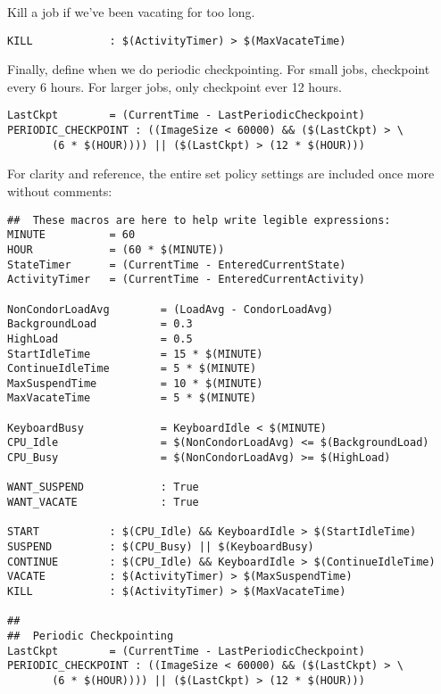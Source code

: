 Kill a job if we've been vacating for too long.

\begin{verbatim}
KILL            : $(ActivityTimer) > $(MaxVacateTime)
\end{verbatim}

Finally, define when we do periodic checkpointing.  For small jobs,
checkpoint every 6 hours.  For larger jobs, only checkpoint ever 12
hours.  

\begin{verbatim}
LastCkpt        = (CurrentTime - LastPeriodicCheckpoint)
PERIODIC_CHECKPOINT : ((ImageSize < 60000) && ($(LastCkpt) > \
       (6 * $(HOUR)))) || ($(LastCkpt) > (12 * $(HOUR))) 
\end{verbatim}

For clarity and reference, the entire set policy settings are included
once more without comments:

\begin{verbatim}
##  These macros are here to help write legible expressions:
MINUTE          = 60
HOUR            = (60 * $(MINUTE))
StateTimer      = (CurrentTime - EnteredCurrentState)
ActivityTimer   = (CurrentTime - EnteredCurrentActivity)

NonCondorLoadAvg        = (LoadAvg - CondorLoadAvg)
BackgroundLoad          = 0.3
HighLoad                = 0.5
StartIdleTime           = 15 * $(MINUTE)
ContinueIdleTime        = 5 * $(MINUTE)
MaxSuspendTime          = 10 * $(MINUTE)
MaxVacateTime           = 5 * $(MINUTE)

KeyboardBusy            = KeyboardIdle < $(MINUTE)
CPU_Idle                = $(NonCondorLoadAvg) <= $(BackgroundLoad)
CPU_Busy                = $(NonCondorLoadAvg) >= $(HighLoad)

WANT_SUSPEND            : True
WANT_VACATE             : True

START           : $(CPU_Idle) && KeyboardIdle > $(StartIdleTime)
SUSPEND         : $(CPU_Busy) || $(KeyboardBusy)
CONTINUE        : $(CPU_Idle) && KeyboardIdle > $(ContinueIdleTime)
VACATE          : $(ActivityTimer) > $(MaxSuspendTime)
KILL            : $(ActivityTimer) > $(MaxVacateTime)

##
##  Periodic Checkpointing
LastCkpt        = (CurrentTime - LastPeriodicCheckpoint)
PERIODIC_CHECKPOINT : ((ImageSize < 60000) && ($(LastCkpt) > \
       (6 * $(HOUR)))) || ($(LastCkpt) > (12 * $(HOUR))) 
\end{verbatim}


